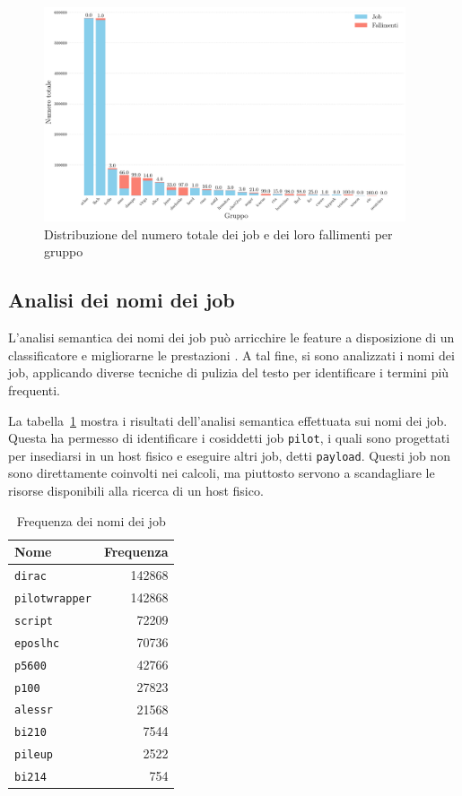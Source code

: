 \begin{figure}[!h]
    \includegraphics[width=0.95\textwidth]{images/njobs_perqueue}
    \caption{Distribuzione del numero totale dei job e dei loro fallimenti per
    gruppo}
    \label{fig:njobs_perqueue}
\end{figure}

\subsection{Analisi dei nomi dei job}

L'analisi semantica dei nomi dei job può arricchire le feature a disposizione
di un classificatore e migliorarne le prestazioni \cite{Banjongkan2021}. A tal
fine, si sono analizzati i nomi dei job, applicando diverse tecniche di
pulizia del testo per identificare i termini più frequenti.

La tabella~\ref{table:job_names} mostra i risultati dell'analisi semantica
effettuata sui nomi dei job. Questa ha permesso di identificare i cosiddetti
job \texttt{pilot}, i quali sono progettati per insediarsi in un host fisico e
eseguire altri job, detti \texttt{payload}. Questi job non sono direttamente
coinvolti nei calcoli, ma piuttosto servono a scandagliare le risorse
disponibili alla ricerca di un host fisico.

\begin{table}[!h]
    \centering
    \caption{Frequenza dei nomi dei job}
    \begin{tabular}{lr}
        \toprule
        \textbf{Nome} & \textbf{Frequenza} \\
        \midrule
        \texttt{dirac} & 142868 \\
        \texttt{pilotwrapper} & 142868 \\
        \texttt{script} & 72209 \\
        \texttt{eposlhc} & 70736 \\
        \texttt{p5600} & 42766 \\
        \texttt{p100} & 27823 \\
        \texttt{alessr} & 21568 \\
        \texttt{bi210} & 7544 \\
        \texttt{pileup} & 2522 \\
        \texttt{bi214} & 754 \\
        \bottomrule
    \end{tabular}
    \label{table:job_names}
\end{table}


